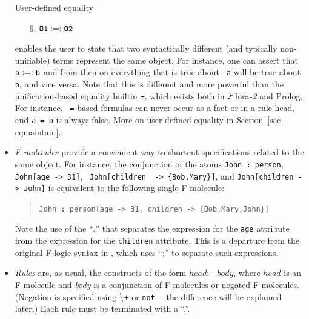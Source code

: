 \documentclass[11pt]{article}
\newcommand{\isa}{\,{\bf{:}}\,}
\newcommand{\mvd}{{\mbox{\tt \,->\,}}}  %
\newcommand{\FLORA}{{\mbox{\sc ${\cal F}${lora}\rm\emph{-2}}}\xspace}
\newcommand{\fl}{\mbox{F-logic}\xspace}
\newcommand{\NAF}{\mbox{\tt \ensuremath{\tt\backslash}+}\xspace}
\newcommand{\TNOT}{{{\tt not}}\xspace}
\begin{document}
\begin{itemize}
  User-defined equality
  \begin{enumerate}
    \item[6.] $\tt O1 :=: O2$
  \end{enumerate}
  enables the user to state that two syntactically different (and typically
  non-unifiable) terms represent the same object. For instance, one can
  assert that $\tt a :=: b$ and from then on everything that is true about {\tt
  a}  will be true about {\tt b}, and vice versa. Note that this is
  different and more powerful than the unification-based equality builtin
  {\tt =}, which exists both in \FLORA and Prolog. For instance, {\tt
  =}-based formulas can never occur as a fact or in a rule head, and {\tt a =
  b} is always false.  More on user-defined equality in
  Section~\ref{sec-eqmaintain}.

\item
  \emph{F-molecules} provide a convenient way to shortcut specifications
  related to the same object. For instance, the conjunction of the atoms
  {\tt John{\isa}person}, {\tt John[age{\mvd}31]}, {\tt
  John[children \mvd \{Bob,Mary\}]}, and {\tt John[children\mvd John]}
  is equivalent to the following single F-molecule:
  \begin{quote}
    {\tt John{\isa}person[age{\mvd}31, children\mvd\{Bob,Mary,John\}]} 
  \end{quote}
  Note the use of the ``,'' that separates the expression for the {\tt age}
  attribute from the expression for the {\tt children} attribute. This is a
  departure from the original \fl syntax in \cite{KLW95}, which uses ``;'' 
  to separate such expressions.
  
\item \emph{Rules} are, as usual, the constructs of the form $head :-
  body$, where $head$ is an F-molecule and \emph{body} is a conjunction of
  F-molecules or negated F-molecules. (Negation is specified using {\NAF}
    or \TNOT --- the difference will be explained later.)
  Each rule must be terminated with a ``.''.
  

\end{itemize}
\end{document}
